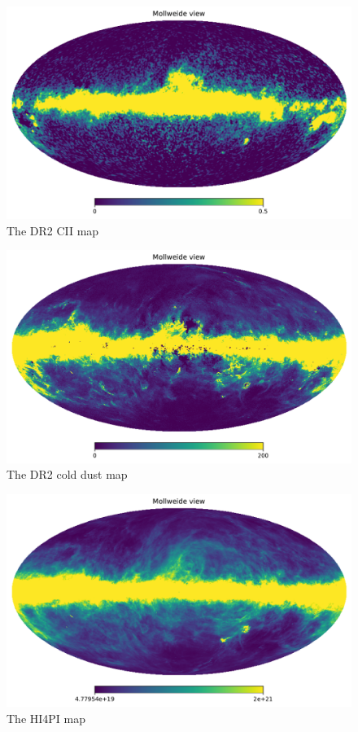 \documentclass{aa}
\begin{document}
\begin{figure}
  \centering
  \includegraphics[width=\columnwidth]{figures/cii_DR2.pdf}
  \caption{The DR2 CII map}
  \label{fig:cii_DR2}
\end{figure}
\begin{figure}
  \centering
  \includegraphics[width=\columnwidth]{figures/cold_dust.pdf}
  \caption{The DR2 cold dust map}
  \label{fig:cold_dust}
\end{figure}
\begin{figure}
  \centering
  \includegraphics[width=\columnwidth]{figures/h14pi.pdf}
  \caption{The HI4PI map}
  \label{fig:h14pi}
\end{figure}
\end{document}
